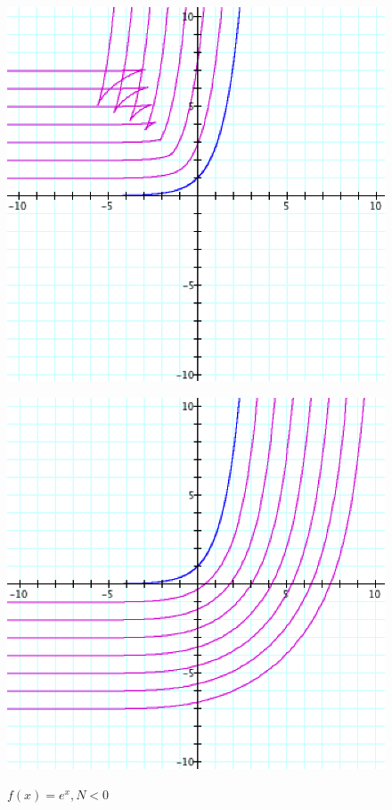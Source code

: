 \begin{figure}[h]
  \begin{minipage}[b]{\w}
    \centering
    \label{example:4}
    \includegraphics[width=\fw]{img/03-some-examples/04.png}
    \caption{$f(x) = e ^ x, N > 0$}
    \vspace{4ex}
  \end{minipage} %
  \begin{minipage}[b]{0.5\linewidth}
    \centering
    \label{example:5}
    \includegraphics[width=\fw]{img/03-some-examples/05.png}
    \caption{$f(x) = e^x, N < 0$}
    \vspace{4ex}
  \end{minipage} %
\end{figure}

